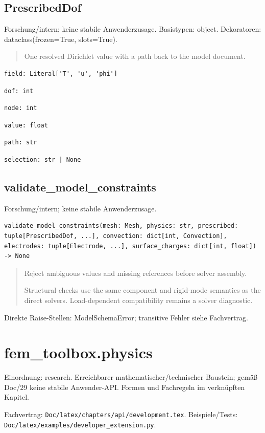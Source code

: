 \subsection{PrescribedDof}
Forschung/intern; keine stabile Anwenderzusage.
Basistypen: object. Dekoratoren: dataclass(frozen=True, slots=True).
\begin{quote}
One resolved Dirichlet value with a path back to the model document.
\end{quote}
\begin{lstlisting}
field: Literal['T', 'u', 'phi']
\end{lstlisting}
\begin{lstlisting}
dof: int
\end{lstlisting}
\begin{lstlisting}
node: int
\end{lstlisting}
\begin{lstlisting}
value: float
\end{lstlisting}
\begin{lstlisting}
path: str
\end{lstlisting}
\begin{lstlisting}
selection: str | None
\end{lstlisting}
\subsection{validate\_model\_constraints}
Forschung/intern; keine stabile Anwenderzusage.
\begin{lstlisting}
validate_model_constraints(mesh: Mesh, physics: str, prescribed: tuple[PrescribedDof, ...], convection: dict[int, Convection], electrodes: tuple[Electrode, ...], surface_charges: dict[int, float]) -> None
\end{lstlisting}
\begin{quote}
Reject ambiguous values and missing references before solver assembly.\par Structural checks use the same component and rigid-mode semantics as the direct solvers. Load-dependent compatibility remains a solver diagnostic.
\end{quote}
Direkte Raise-Stellen: ModelSchemaError; transitive Fehler siehe Fachvertrag.
\section{fem\_toolbox.physics}
Einordnung: research. Erreichbarer mathematischer/technischer Baustein; gemäß Doc/29 keine stabile Anwender-API. Formen und Fachregeln im verknüpften Kapitel.
\par Fachvertrag: \nolinkurl{Doc/latex/chapters/api/development.tex}. Beispiele/Tests:
\nolinkurl{Doc/latex/examples/developer_extension.py}.
